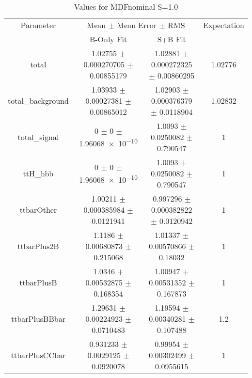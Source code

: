 \begin{table}
\centering
\caption{Values for MDFnominal S=1.0}
\begin{tabular}{cccc}
\toprule
Parameter & \multicolumn{2}{c}{Mean $\pm$ Mean Error $\pm$ RMS} & Expectation\\
 & B-Only Fit & S+B Fit & \\
\midrule
total & \num{1.02755} $\pm$ \num{0.000270705} $\pm$ \num{0.00855179} & \num{1.02881} $\pm$ \num{0.000272325} $\pm$ \num{0.00860295} & \num{1.02776}\\
total\_background & \num{1.03933} $\pm$ \num{0.00027381} $\pm$ \num{0.00865012} & \num{1.02903} $\pm$ \num{0.000376379} $\pm$ \num{0.0118904} & \num{1.02832}\\
total\_signal & \num{0} $\pm$ \num{0} $\pm$ \num{1.96068e-10} & \num{1.0093} $\pm$ \num{0.0250082} $\pm$ \num{0.790547} & \num{1}\\
ttH\_hbb & \num{0} $\pm$ \num{0} $\pm$ \num{1.96068e-10} & \num{1.0093} $\pm$ \num{0.0250082} $\pm$ \num{0.790547} & \num{1}\\
ttbarOther & \num{1.00211} $\pm$ \num{0.000385984} $\pm$ \num{0.0121941} & \num{0.997296} $\pm$ \num{0.000382822} $\pm$ \num{0.0120942} & \num{1}\\
ttbarPlus2B & \num{1.1186} $\pm$ \num{0.00680873} $\pm$ \num{0.215068} & \num{1.01337} $\pm$ \num{0.00570866} $\pm$ \num{0.18032} & \num{1}\\
ttbarPlusB & \num{1.0346} $\pm$ \num{0.00532875} $\pm$ \num{0.168354} & \num{1.00947} $\pm$ \num{0.00531352} $\pm$ \num{0.167873} & \num{1}\\
ttbarPlusBBbar & \num{1.29631} $\pm$ \num{0.00224923} $\pm$ \num{0.0710483} & \num{1.19594} $\pm$ \num{0.00340281} $\pm$ \num{0.107488} & \num{1.2}\\
ttbarPlusCCbar & \num{0.931233} $\pm$ \num{0.0029125} $\pm$ \num{0.0920078} & \num{0.99954} $\pm$ \num{0.00302499} $\pm$ \num{0.0955615} & \num{1}\\
\bottomrule
\end{tabular}
\end{table}